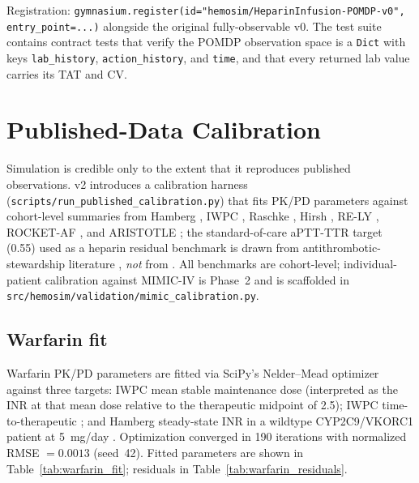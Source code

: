 \documentclass[11pt]{article}
\begin{document}
Registration: \texttt{gymnasium.register(id="hemosim/HeparinInfusion-POMDP-v0", entry\_point=...)} alongside the original fully-observable v0. The test suite contains contract tests that verify the POMDP observation space is a \texttt{Dict} with keys \texttt{lab\_history}, \texttt{action\_history}, and \texttt{time}, and that every returned lab value carries its TAT and CV.

\section{Published-Data Calibration}
\label{sec:calibration}

Simulation is credible only to the extent that it reproduces published observations. v2 introduces a calibration harness (\texttt{scripts/run\_published\_calibration.py}) that fits PK/PD parameters against cohort-level summaries from Hamberg \citep{hamberg2007}, IWPC \citep{iwpc2009}, Raschke \citep{raschke1993}, Hirsh \citep{hirsh2001}, RE-LY \citep{connolly2009}, ROCKET-AF \citep{patel2011}, and ARISTOTLE \citep{granger2011}; the standard-of-care aPTT-TTR target (0.55) used as a heparin residual benchmark is drawn from antithrombotic-stewardship literature \citep{wan2008}, \emph{not} from \citet{nemati2016}. All benchmarks are cohort-level; individual-patient calibration against MIMIC-IV is Phase~2 and is scaffolded in \texttt{src/hemosim/validation/mimic\_calibration.py}.

\subsection{Warfarin fit}

Warfarin PK/PD parameters are fitted via SciPy's Nelder--Mead optimizer against three targets: IWPC mean stable maintenance dose \citep{iwpc2009} (interpreted as the INR at that mean dose relative to the therapeutic midpoint of 2.5); IWPC time-to-therapeutic \citep{iwpc2009}; and Hamberg steady-state INR in a wildtype CYP2C9/VKORC1 patient at 5~mg/day \citep{hamberg2007}. Optimization converged in 190 iterations with normalized RMSE $= 0.0013$ (seed~42). Fitted parameters are shown in Table~\ref{tab:warfarin_fit}; residuals in Table~\ref{tab:warfarin_residuals}.
\end{document}
